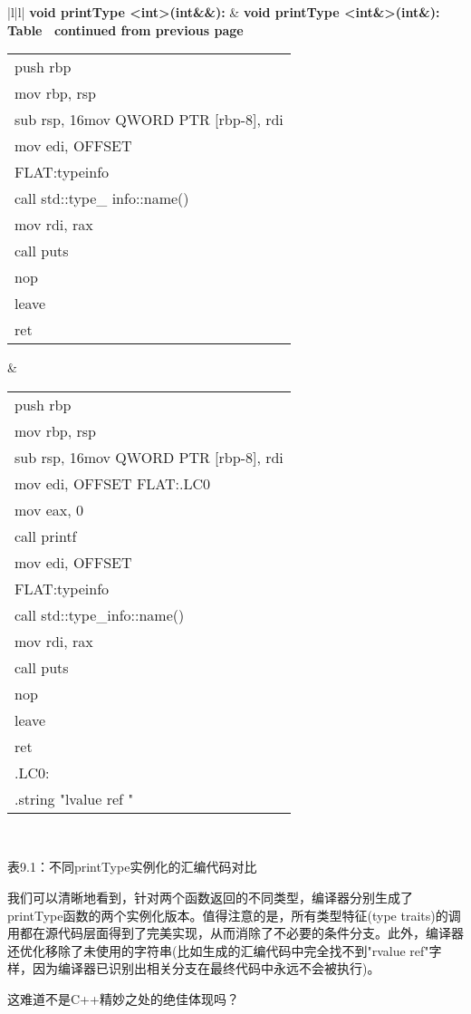\begin{longtable}{|l|l|}
\hline
\textbf{void printType \textless{}int\textgreater{}(int\&\&):} &
  \textbf{void printType \textless{}int\&\textgreater{}(int\&):} \\ \hline
\endfirsthead
%
%
{{\bfseries Table \thetable\ continued from previous page}} \\
\endhead
%
\begin{tabular}[c]{@{}l@{}}push rbp\\ mov rbp, rsp\\ sub rsp, 16mov QWORD PTR {[}rbp-8{]}, rdi\\ mov edi, OFFSET \\                   FLAT:typeinfo \\ call std::type\_ info::name() \\ mov rdi, rax\\ call puts \\ nop \\ leave \\ ret\end{tabular} &
  \begin{tabular}[c]{@{}l@{}}push rbp\\ mov rbp, rsp\\ sub rsp, 16mov QWORD PTR {[}rbp-8{]}, rdi\\ mov edi, OFFSET FLAT:.LC0 \\ mov eax, 0 \\ call printf \\ mov edi, OFFSET \\                  FLAT:typeinfo \\ call std::type\_info::name() \\ mov rdi, rax\\ call puts \\ nop \\ leave \\ ret \\   .LC0:\\     .string "lvalue ref "\end{tabular} \\ \hline
\end{longtable}

\begin{center}
表9.1：不同printType实例化的汇编代码对比
\end{center}

我们可以清晰地看到，针对两个函数返回的不同类型，编译器分别生成了printType函数的两个实例化版本。值得注意的是，所有类型特征(type traits)的调用都在源代码层面得到了完美实现，从而消除了不必要的条件分支。此外，编译器还优化移除了未使用的字符串(比如生成的汇编代码中完全找不到"rvalue ref"字样，因为编译器已识别出相关分支在最终代码中永远不会被执行)。

这难道不是C++精妙之处的绝佳体现吗？





















